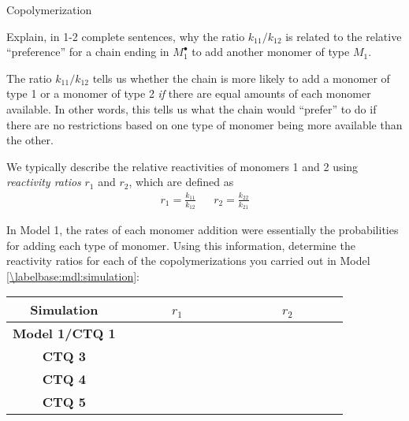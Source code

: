\begin{activity}{Copolymerization}
\begin{ctqs}
		\begin{solution}[1in]\end{solution}
	
	\question Explain, in 1-2 complete sentences, why the ratio $k_{11}/k_{12}$ is related to the relative ``preference'' for a chain ending in $M_1^\bullet$ to add another monomer of type $M_1$.
	
		\begin{solution}[1.5in]
			The ratio $k_{11}/k_{12}$ tells us whether the chain is more likely to add a monomer of type 1 or a monomer of type 2 \emph{if} there are equal amounts of each monomer available.  In other words, this tells us what the chain would ``prefer'' to do if there are no restrictions based on one type of monomer being more available than the other.
		\end{solution}
	
\end{ctqs}

\begin{infobox}

	We typically  describe the relative reactivities of monomers 1 and 2 using \emph{reactivity ratios} $r_1$ and $r_2$, which are defined as
	\begin{align*}
		r_1 = \frac{k_{11}}{k_{12}} && r_2 = \frac{k_{22}}{k_{21}}
	\end{align*}

\end{infobox}

\begin{ctqs}

	\question In Model 1, the rates of each monomer addition were essentially the probabilities for adding each type of monomer.  Using this information, determine the reactivity ratios for each of the copolymerizations you carried out in Model \ref{\labelbase:mdl:simulation}:
	
		\begin{center}
		\renewcommand{\arraystretch}{2.5}
		\begin{tabular}{|c|c|c|}
			\hline
			\textbf{Simulation} & ~~~~~~$r_1$~~~~~~ & ~~~~~~$r_2$~~~~~~ \\\hline
			\textbf{Model 1/CTQ 1} & \answer{$\frac{0.5}{0.5}=1$} & \answer{$\frac{0.5}{0.5}=1$} \\\hline
			\textbf{CTQ 3} & \answer{$\frac{0.2}{0.8}=0.25$} & \answer{$\frac{0.2}{0.8}=0.25$} \\\hline
			\textbf{CTQ 4} & \answer{$\frac{0.8}{0.2}=4$} & \answer{$\frac{0.8}{0.2}=4$} \\\hline
			\textbf{CTQ 5} & \answer{$\frac{0.2}{0.8}=0.25$} & \answer{$\frac{0.8}{0.2}=4$} \\\hline
		\end{tabular}
		\end{center}


\end{ctqs}
\end{activity}
